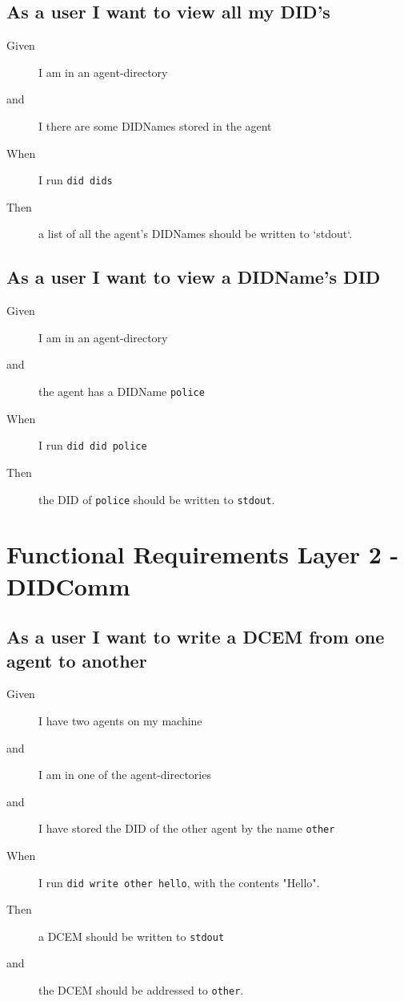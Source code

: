 \subsection{As a user I want to view all my DID's}
\begin{description}
    \item[Given] I am in an agent-directory
    \item[and] I there are some DIDNames stored in the agent
    \item[When] I run \texttt{did dids}
    \item[Then] a list of all the agent's DIDNames should be written to `stdout`.
\end{description}


\subsection{As a user I want to view a DIDName's DID}
\begin{description}
    \item[Given] I am in an agent-directory
    \item[and] the agent has a DIDName \texttt{police}
    \item[When] I run \texttt{did did police}
    \item[Then] the DID of \texttt{police} should be written to \texttt{stdout}.
\end{description}


\newpage

\section{Functional Requirements Layer 2 - DIDComm}

\subsection{As a user I want to write a DCEM from one agent to another}
\begin{description}
    \item[Given] I have two agents on my machine
    \item[and] I am in one of the agent-directories
    \item[and] I have stored the DID of the other agent by the name \texttt{other}
    \item[When] I run \texttt{did write other hello}, with the contents "Hello".
    \item[Then] a DCEM should be written to \texttt{stdout}
    \item[and] the DCEM should be addressed to \texttt{other}. 
\end{description}

